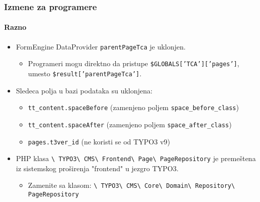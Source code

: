 \begin{frame}[fragile]
	\frametitle{Izmene za programere}
	\framesubtitle{Razno}

	\begin{itemize}
		\item FormEngine DataProvider \texttt{parentPageTca} je uklonjen.

			\begin{itemize}\smaller
				\item[\ding{228}] Programeri mogu direktno da pristupe \texttt{\$GLOBALS['TCA']['pages']}, umesto \texttt{\$result['parentPageTca']}.
			\end{itemize}\normalsize

		\item Sledeca polja u bazi podataka su uklonjena:

			\begin{itemize}\smaller
				\item \texttt{tt\_content.spaceBefore} (zamenjeno poljem \texttt{space\_before\_class})
				\item \texttt{tt\_content.spaceAfter} (zamenjeno poljem \texttt{space\_after\_class})
				\item \texttt{pages.t3ver\_id} (ne koristi se od TYPO3 v9)
			\end{itemize}\normalsize

		\item PHP klasa
			\texttt{\textbackslash
				TYPO3\textbackslash
				CMS\textbackslash
				Frontend\textbackslash
				Page\textbackslash
				PageRepository} je premeštena iz sistemskog proširenja "frontend" u jezgro TYPO3.

			\begin{itemize}\smaller
				\item Zamenite sa klasom:
					\texttt{\textbackslash
						TYPO3\textbackslash
						CMS\textbackslash
						Core\textbackslash
						Domain\textbackslash
						Repository\textbackslash
						PageRepository}
			\end{itemize}\normalsize

	\end{itemize}

\end{frame}



